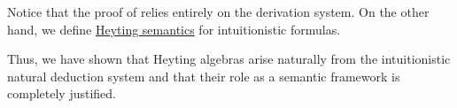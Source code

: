 \begin{remark}\label{rem:thm:intuitionistic_lindenbaum_tarski_algebra/syntactic_proof}
  Notice that the proof of  relies entirely on the derivation system. On the other hand, we define \hyperref[def:propositional_heyting_algebra_semantics]{Heyting semantics} for intuitionistic formulas.

  Thus, we have shown that Heyting algebras arise naturally from the intuitionistic natural deduction system and that their role as a semantic framework is completely justified.
\end{remark}
